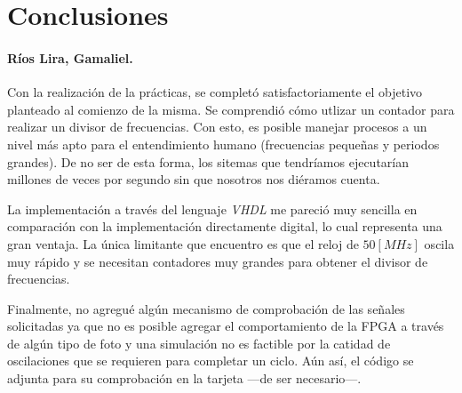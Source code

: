 \documentclass[../main.tex]{subfiles}
\begin{document}
\clearpage
\section{Conclusiones}
\paragraph{Ríos Lira, Gamaliel.} Con la realización de la prácticas, se 
completó satisfactoriamente el objetivo planteado al comienzo de la misma. Se 
comprendió cómo utlizar un contador para realizar un divisor de frecuencias.  
Con esto, es posible manejar procesos a un nivel más apto para el 
entendimiento humano (frecuencias pequeñas y periodos grandes). De no ser de 
esta forma, los sitemas que tendríamos ejecutarían millones de veces por 
segundo sin que nosotros nos diéramos cuenta.

La implementación a través del lenguaje \textit{VHDL} me pareció muy sencilla 
en comparación con la implementación directamente digital, lo cual representa 
una gran ventaja. La única limitante que encuentro es que el reloj de $50 
[MHz]$ oscila muy rápido y se necesitan contadores muy grandes para obtener el 
divisor de frecuencias.

Finalmente, no agregué algún mecanismo de comprobación de las señales 
solicitadas ya que no es posible agregar el comportamiento de la FPGA a través 
de algún tipo de foto y una simulación no es factible por la catidad de 
oscilaciones que se requieren para completar un ciclo. Aún así, el código se 
adjunta para su comprobación en la tarjeta ---de ser necesario---.
\end{document}
